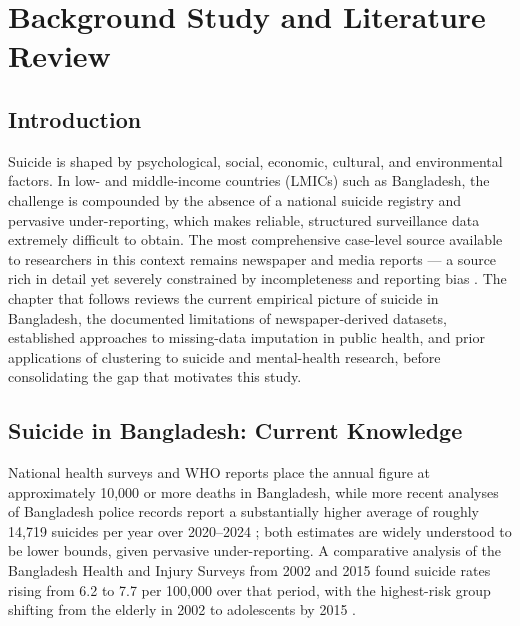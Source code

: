 \chapter{Background Study and Literature Review}

\section{Introduction}

Suicide is shaped by psychological, social, economic, cultural, and environmental factors. In low- and middle-income countries (LMICs) such as Bangladesh, the challenge is compounded by the absence of a national suicide registry and pervasive under-reporting, which makes reliable, structured surveillance data extremely difficult to obtain. The most comprehensive case-level source available to researchers in this context remains newspaper and media reports --- a source rich in detail yet severely constrained by incompleteness and reporting bias \cite{ref1,ref50}. The chapter that follows reviews the current empirical picture of suicide in Bangladesh, the documented limitations of newspaper-derived datasets, established approaches to missing-data imputation in public health, and prior applications of clustering to suicide and mental-health research, before consolidating the gap that motivates this study.

\section{Suicide in Bangladesh: Current Knowledge}

National health surveys and WHO reports place the annual figure at approximately 10,000 or more deaths in Bangladesh, while more recent analyses of Bangladesh police records report a substantially higher average of roughly 14,719 suicides per year over 2020--2024 \cite{ref1,ref50,ref3}; both estimates are widely understood to be lower bounds, given pervasive under-reporting. A comparative analysis of the Bangladesh Health and Injury Surveys from 2002 and 2015 found suicide rates rising from 6.2 to 7.7 per 100,000 over that period, with the highest-risk group shifting from the elderly in 2002 to adolescents by 2015 \cite{ref26}.

